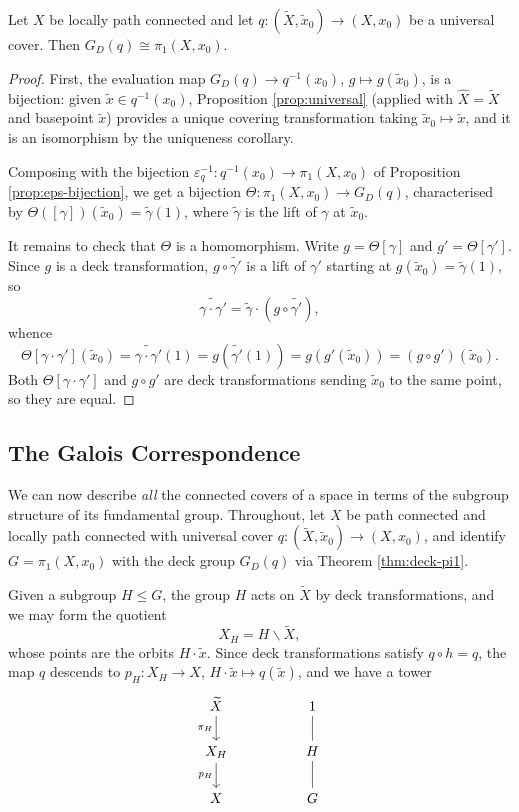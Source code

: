 \begin{theorem} \label{thm:deck-pi1}
	Let $X$ be locally path connected and let $q: (\widetilde X, \tilde x_0) \to (X, x_0)$ be a universal cover. Then $G_D(q) \cong \pi_1(X, x_0)$.
\end{theorem}
\begin{proof}
	First, the evaluation map $G_D(q) \to q^{-1}(x_0)$, $g \mapsto g(\tilde x_0)$, is a bijection: given $\tilde x \in q^{-1}(x_0)$, Proposition \ref{prop:universal} (applied with $\hat X = \widetilde X$ and basepoint $\tilde x$) provides a unique covering transformation taking $\tilde x_0 \mapsto \tilde x$, and it is an isomorphism by the uniqueness corollary.

	Composing with the bijection $\varepsilon_q^{-1}: q^{-1}(x_0) \to \pi_1(X,x_0)$ of Proposition \ref{prop:eps-bijection}, we get a bijection $\Theta: \pi_1(X, x_0) \to G_D(q)$, characterised by $\Theta([\gamma])(\tilde x_0) = \tilde\gamma(1)$, where $\tilde\gamma$ is the lift of $\gamma$ at $\tilde x_0$.

	It remains to check that $\Theta$ is a homomorphism. Write $g = \Theta[\gamma]$ and $g' = \Theta[\gamma']$. Since $g$ is a deck transformation, $g \circ \tilde{\gamma'}$ is a lift of $\gamma'$ starting at $g(\tilde x_0) = \tilde\gamma(1)$, so
	$$
	\widetilde{\gamma\cdot\gamma'} = \tilde\gamma \cdot (g \circ \tilde{\gamma'}),
	$$
	whence
	$$
	\Theta[\gamma\cdot\gamma'](\tilde x_0) = \widetilde{\gamma\cdot\gamma'}(1) = g(\tilde{\gamma'}(1)) = g(g'(\tilde x_0)) = (g \circ g')(\tilde x_0).
	$$
	Both $\Theta[\gamma\cdot\gamma']$ and $g \circ g'$ are deck transformations sending $\tilde x_0$ to the same point, so they are equal.
\end{proof}

\subsection{The Galois Correspondence}

We can now describe \emph{all} the connected covers of a space in terms of the subgroup
structure of its fundamental group. Throughout, let $X$ be path connected and locally
path connected with universal cover $q: (\widetilde X, \tilde x_0) \to (X, x_0)$, and
identify $G = \pi_1(X, x_0)$ with the deck group $G_D(q)$ via Theorem \ref{thm:deck-pi1}.

Given a subgroup $H \leq G$, the group $H$ acts on $\widetilde X$ by deck transformations,
and we may form the quotient
$$
X_H = H \backslash \widetilde X,
$$
whose points are the orbits $H \cdot \tilde x$. Since deck transformations satisfy
$q \circ h = q$, the map $q$ descends to $p_H: X_H \to X$, $H\cdot\tilde x \mapsto q(\tilde x)$,
and we have a tower
\[\begin{tikzcd}
	{\widetilde X} \arrow[d, "{\pi_H}"'] & & 1 \arrow[d, no head] \\
	{X_H} \arrow[d, "{p_H}"'] & & H \arrow[d, no head] \\
	X & & G
\end{tikzcd}\]


